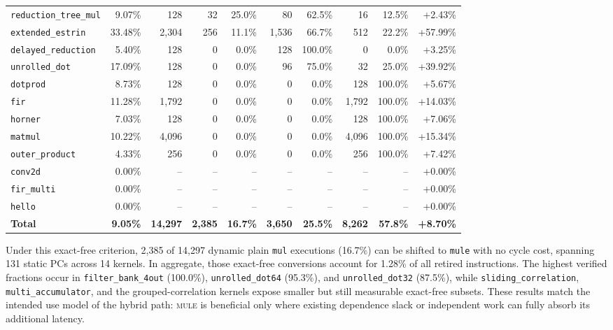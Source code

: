 \begin{table}[t]
{\begin{tabular}{l r r r r r r r r r}
\texttt{reduction\_tree\_mul} & 9.07\% & 128 & 32 & 25.0\% & 80 & 62.5\% & 16 & 12.5\% & +2.43\% \\
\texttt{extended\_estrin} & 33.48\% & 2,304 & 256 & 11.1\% & 1,536 & 66.7\% & 512 & 22.2\% & +57.99\% \\
\texttt{delayed\_reduction} & 5.40\% & 128 & 0 & 0.0\% & 128 & 100.0\% & 0 & 0.0\% & +3.25\% \\
\texttt{unrolled\_dot} & 17.09\% & 128 & 0 & 0.0\% & 96 & 75.0\% & 32 & 25.0\% & +39.92\% \\
\texttt{dotprod} & 8.73\% & 128 & 0 & 0.0\% & 0 & 0.0\% & 128 & 100.0\% & +5.67\% \\
\texttt{fir} & 11.28\% & 1,792 & 0 & 0.0\% & 0 & 0.0\% & 1,792 & 100.0\% & +14.03\% \\
\texttt{horner} & 7.03\% & 128 & 0 & 0.0\% & 0 & 0.0\% & 128 & 100.0\% & +7.06\% \\
\texttt{matmul} & 10.22\% & 4,096 & 0 & 0.0\% & 0 & 0.0\% & 4,096 & 100.0\% & +15.34\% \\
\texttt{outer\_product} & 4.33\% & 256 & 0 & 0.0\% & 0 & 0.0\% & 256 & 100.0\% & +7.42\% \\
\texttt{conv2d} & 0.00\% & -- & -- & -- & -- & -- & -- & -- & +0.00\% \\
\texttt{fir\_multi} & 0.00\% & -- & -- & -- & -- & -- & -- & -- & +0.00\% \\
\texttt{hello} & 0.00\% & -- & -- & -- & -- & -- & -- & -- & +0.00\% \\
\hline
\textbf{Total} & \textbf{9.05\%} & \textbf{14,297} & \textbf{2,385} & \textbf{16.7\%} & \textbf{3,650} & \textbf{25.5\%} & \textbf{8,262} & \textbf{57.8\%} & \textbf{+8.70\%} \\
\hline
\end{tabular}%
}
\end{table}

Under this exact-free criterion, 2,385 of 14,297 dynamic plain
\texttt{mul} executions (16.7\%) can be shifted to \texttt{mule} with no
cycle cost, spanning 131 static PCs across 14 kernels. In aggregate,
those exact-free conversions account for 1.28\% of all retired
instructions. The highest verified fractions occur in
\texttt{filter\_bank\_4out} (100.0\%), \texttt{unrolled\_dot64}
(95.3\%), and \texttt{unrolled\_dot32} (87.5\%), while
\texttt{sliding\_correlation}, \texttt{multi\_accumulator}, and the
grouped-correlation kernels expose smaller but still measurable exact-free
subsets. These results match the intended use model of the hybrid path:
\textsc{mule} is beneficial only where existing dependence slack or
independent work can fully absorb its additional latency.

